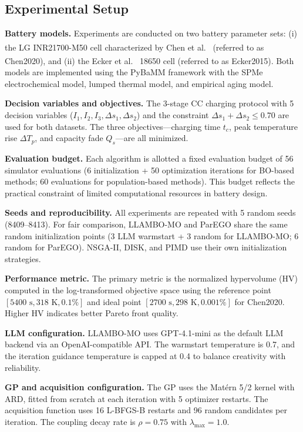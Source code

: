 \documentclass[lettersize,journal]{IEEEtran}
\let\OLDcite\cite
\renewcommand{\cite}[1]{\textsuperscript{\OLDcite{#1}}}
\begin{document}
\subsection{Experimental Setup}

\textbf{Battery models.} Experiments are conducted on two battery parameter sets: (i) the LG INR21700-M50 cell characterized by Chen et al.\ \cite{ref_chen2020} (referred to as Chen2020), and (ii) the Ecker et al.\ \cite{ref_ecker2015} 18650 cell (referred to as Ecker2015). Both models are implemented using the PyBaMM framework with the SPMe electrochemical model, lumped thermal model, and empirical aging model.

\textbf{Decision variables and objectives.} The 3-stage CC charging protocol with 5 decision variables ($I_1, I_2, I_3, \Delta s_1, \Delta s_2$) and the constraint $\Delta s_1 + \Delta s_2 \leq 0.70$ are used for both datasets. The three objectives---charging time $t_c$, peak temperature rise $\Delta T_p$, and capacity fade $Q_s$---are all minimized.

\textbf{Evaluation budget.} Each algorithm is allotted a fixed evaluation budget of 56 simulator evaluations (6 initialization + 50 optimization iterations for BO-based methods; 60 evaluations for population-based methods). This budget reflects the practical constraint of limited computational resources in battery design.

\textbf{Seeds and reproducibility.} All experiments are repeated with 5 random seeds (8409--8413). For fair comparison, LLAMBO-MO and ParEGO share the same random initialization points (3 LLM warmstart + 3 random for LLAMBO-MO; 6 random for ParEGO). NSGA-II, DISK, and PIMD use their own initialization strategies.

\textbf{Performance metric.} The primary metric is the normalized hypervolume (HV) computed in the log-transformed objective space using the reference point $[5400\text{ s}, 318\text{ K}, 0.1\%]$ and ideal point $[2700\text{ s}, 298\text{ K}, 0.001\%]$ for Chen2020. Higher HV indicates better Pareto front quality.

\textbf{LLM configuration.} LLAMBO-MO uses GPT-4.1-mini as the default LLM backend via an OpenAI-compatible API. The warmstart temperature is 0.7, and the iteration guidance temperature is capped at 0.4 to balance creativity with reliability.

\textbf{GP and acquisition configuration.} The GP uses the Mat\'{e}rn 5/2 kernel with ARD, fitted from scratch at each iteration with 5 optimizer restarts. The acquisition function uses 16 L-BFGS-B restarts and 96 random candidates per iteration. The coupling decay rate is $\rho = 0.75$ with $\lambda_{\max} = 1.0$.
\end{document}
